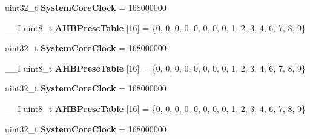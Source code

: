\begin{DoxyCompactItemize}
\item 
\hypertarget{group___s_t_m32_f4xx___system___private___variables_gaa3cd3e43291e81e795d642b79b6088e6}{uint32\-\_\-t {\bfseries System\-Core\-Clock} = 168000000}\label{group___s_t_m32_f4xx___system___private___variables_gaa3cd3e43291e81e795d642b79b6088e6}

\item 
\hypertarget{group___s_t_m32_f4xx___system___private___variables_gacdc3ef54c0704c90e69a8a84fb2d970d}{\-\_\-\-\_\-\-I uint8\-\_\-t {\bfseries A\-H\-B\-Presc\-Table} \mbox{[}16\mbox{]} = \{0, 0, 0, 0, 0, 0, 0, 0, 1, 2, 3, 4, 6, 7, 8, 9\}}\label{group___s_t_m32_f4xx___system___private___variables_gacdc3ef54c0704c90e69a8a84fb2d970d}

\item 
\hypertarget{group___s_t_m32_f4xx___system___private___variables_gaa3cd3e43291e81e795d642b79b6088e6}{uint32\-\_\-t {\bfseries System\-Core\-Clock} = 168000000}\label{group___s_t_m32_f4xx___system___private___variables_gaa3cd3e43291e81e795d642b79b6088e6}

\item 
\hypertarget{group___s_t_m32_f4xx___system___private___variables_gacdc3ef54c0704c90e69a8a84fb2d970d}{\-\_\-\-\_\-\-I uint8\-\_\-t {\bfseries A\-H\-B\-Presc\-Table} \mbox{[}16\mbox{]} = \{0, 0, 0, 0, 0, 0, 0, 0, 1, 2, 3, 4, 6, 7, 8, 9\}}\label{group___s_t_m32_f4xx___system___private___variables_gacdc3ef54c0704c90e69a8a84fb2d970d}

\item 
\hypertarget{group___s_t_m32_f4xx___system___private___variables_gaa3cd3e43291e81e795d642b79b6088e6}{uint32\-\_\-t {\bfseries System\-Core\-Clock} = 168000000}\label{group___s_t_m32_f4xx___system___private___variables_gaa3cd3e43291e81e795d642b79b6088e6}

\item 
\hypertarget{group___s_t_m32_f4xx___system___private___variables_gacdc3ef54c0704c90e69a8a84fb2d970d}{\-\_\-\-\_\-\-I uint8\-\_\-t {\bfseries A\-H\-B\-Presc\-Table} \mbox{[}16\mbox{]} = \{0, 0, 0, 0, 0, 0, 0, 0, 1, 2, 3, 4, 6, 7, 8, 9\}}\label{group___s_t_m32_f4xx___system___private___variables_gacdc3ef54c0704c90e69a8a84fb2d970d}

\item 
\hypertarget{group___s_t_m32_f4xx___system___private___variables_gaa3cd3e43291e81e795d642b79b6088e6}{uint32\-\_\-t {\bfseries System\-Core\-Clock} = 168000000}\label{group___s_t_m32_f4xx___system___private___variables_gaa3cd3e43291e81e795d642b79b6088e6}


\end{DoxyCompactItemize}
